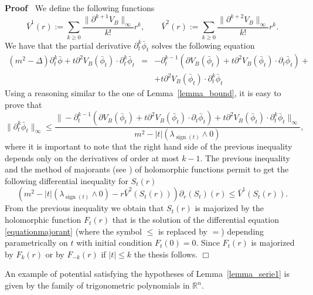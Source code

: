 \documentclass[a4paper,10pt]{article}
\newcommand{\assign}{:=}
\newcommand{\tmop}[1]{\ensuremath{\operatorname{#1}}}
\newenvironment{proof}{\noindent\textbf{Proof\ }}{\hspace*{\fill}$\Box$\medskip}
\begin{document}
\begin{proof}
  We define the following functions
  \[ \bar{V}^1 (r) \assign \sum_{k \geqslant 0} \frac{\| \partial^{k + 1} V_B
     \|_{\infty}}{k!} r^k, \qquad \bar{V}^2 (r) \assign \sum_{k \geqslant 0}
     \frac{\| \partial^{k+ 2} V_B \|_{\infty}}{k!} r^k . \]
  We have that the partial derivative $\partial^k_t \bar{\phi}_t$ solves the
  following equation
  \begin{eqnarray}
    (m^2 - \Delta) \partial^k_t \bar{\phi} + t \partial^2 V_B (\bar{\phi}_t)
    \cdot \partial_t^k \bar{\phi}_t & = & - \partial^{k - 1}_t (\partial V_B
    (\bar{\phi}_t) + t \partial^2 V_B (\bar{\phi}_t) \cdot \partial_t
    \bar{\phi}_t) + \nonumber\\
    &  & + t \partial^2 V_B (\bar{\phi}_t) \cdot \partial_t^k \bar{\phi}_t
    \nonumber
  \end{eqnarray}
  Using a reasoning similar to the one of Lemma~\ref{lemma_bound}, it is easy
  to prove that
  \[ \| \partial^k_t \bar{\phi}_t \|_{\infty} \leqslant \frac{\| -
     \partial^{k - 1}_t (\partial V_B (\bar{\phi}_t) + t \partial^2 V_B
     (\bar{\phi}_t) \cdot \partial_t \bar{\phi}_t) + t \partial^2 V_B
     (\bar{\phi}_t) \cdot \partial_t^k \bar{\phi}_t \|_{\infty}}{m^2 - | t |
     (\lambda_{\tmop{sign} (t)} \wedge 0)}, \]
  where it is important to note that the right hand side of the previous
  inequality depends only on the derivatives of order at most $k - 1$. The
  previous inequality and the method of majorants (see
  {\cite{Van2003majorants}}) of holomorphic functions permit to get the
  following differential inequality for $S_t (r)$
  \begin{equation}
    (m^2 - | t | (\lambda_{\tmop{sign} (t)} \wedge 0) - r \bar{V}^2 (S_t (r)))
    \partial_r (S_t) (r) \leqslant \bar{V}^1 (S_t (r)) .
    \label{equationmajorant}
  \end{equation}
  From the previous inequality we obtain that $S_t (r)$ is majorized by the
  holomorphic function $F_t (r)$ that is the solution of the differential
  equation {\eqref{equationmajorant}} (where the symbol $\leqslant$ is
  replaced by $=$) depending parametrically on $t$ with initial condition $F_t
  (0) = 0$. Since $F_t (r)$ is majorized by $F_k (r)$ or by $F_{- k} (r)$ if
  $| t | \leqslant k$ the thesis follows. 
\end{proof}

\begin{remark}
  \label{remark_serie1}An example of potential satisfying the hypotheses of
  Lemma~\ref{lemma_serie1} is given by the family of trigonometric polynomials
  in $\mathbb{R}^n$.
\end{remark}
\end{document}
